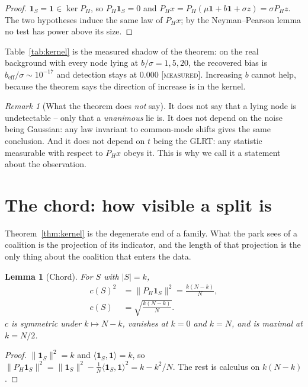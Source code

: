 \documentclass[10pt,twocolumn,a4paper]{article}
\newcommand{\measured}{\textcolor{blue!70!black}{\textsc{[measured]}}}
\newtheorem{lemma}[theorem]{Lemma}
\theoremstyle{definition}
\theoremstyle{remark}
\newtheorem{remark}[theorem]{Remark}
\newcommand{\PH}{P_{H}}
\newcommand{\one}{\mathbf{1}}
\begin{document}
\begin{proof}
$\one_S=\one\in\ker\PH$, so $\PH\one_S=0$ and $\PH x=\PH(\mu\one+b\one+\sigma z)=\sigma\PH z$.
The two hypotheses induce the same law of $\PH x$; by the Neyman--Pearson lemma
\cite{neyman1933} no test has power above its size.
\end{proof}

Table~\ref{tab:kernel} is the measured shadow of the theorem: on the real
background with every node lying at $b/\sigma=1,5,20$, the recovered bias is
$\hat b_{\text{eff}}/\sigma\sim10^{-17}$ and detection stays at $0.000$
\measured. Increasing $b$ cannot help, because the theorem says the direction of
increase is in the kernel.




\begin{remark}[What the theorem does \emph{not} say]
It does not say that a lying node is undetectable -- only that a
\emph{unanimous} lie is. It does not depend on the noise being Gaussian: any
law invariant to common-mode shifts gives the same conclusion. And it does not
depend on $t$ being the GLRT: any statistic measurable with respect to $\PH x$
obeys it. This is why we call it a statement about the observation.
\end{remark}

\section{The chord: how visible a split is}
\label{sec:chord}

Theorem~\ref{thm:kernel} is the degenerate end of a family. What the park sees of
a coalition is the projection of its indicator, and the length of that projection
is the only thing about the coalition that enters the data.

\begin{lemma}[Chord]
\label{lem:chord}
For $S$ with $|S|=k$,
\begin{equation}
\begin{aligned}
c(S)^2&=\|\PH\one_S\|^2=\frac{k(N-k)}{N},\\
c(S)&=\sqrt{\frac{k(N-k)}{N}} .
\end{aligned}
\label{eq:chord}
\end{equation}
$c$ is symmetric under $k\mapsto N-k$, vanishes at $k=0$ and $k=N$, and is
maximal at $k=N/2$.
\end{lemma}

\begin{proof}
$\|\one_S\|^2=k$ and $\langle\one_S,\one\rangle=k$, so
$\|\PH\one_S\|^2=\|\one_S\|^2-\frac1N\langle\one_S,\one\rangle^2=k-k^2/N$.
The rest is calculus on $k(N-k)$.
\end{proof}
\end{document}
